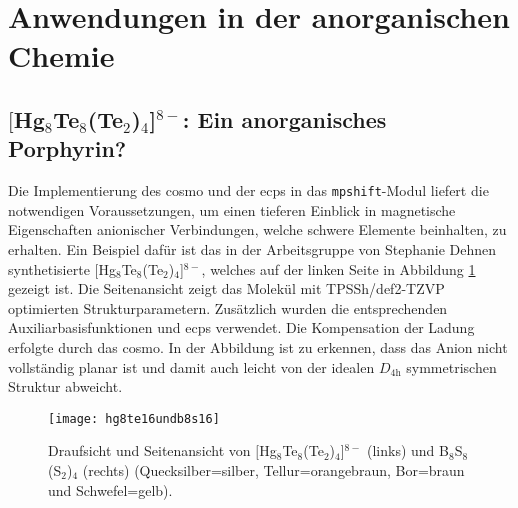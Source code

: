 \section{Anwendungen in der anorganischen Chemie}
\FloatBarrier
\subsection{\texorpdfstring{$[$Hg$_8$Te$_8$(Te$_2$)$_4$]$^{8-}$}{[Hg\_8Te\_8(Te\_2)\_4]8-}: Ein anorganisches Porphyrin?}\label{anorgporh}
Die Implementierung des \ac{cosmo}\supercite{klamt1993cosmo} und der \acp{ecp} in das \texttt{mpshift}-Modul liefert die notwendigen Voraussetzungen, um einen tieferen Einblick in magnetische Eigenschaften anionischer Verbindungen, welche schwere Elemente beinhalten, zu erhalten. Ein Beispiel dafür ist das in der Arbeitsgruppe von Stephanie Dehnen synthetisierte $[$Hg$_8$Te$_8$(Te$_2$)$_4$]$^{8-}$\supercite{dehnenhg4te8}, welches auf der linken Seite in Abbildung \ref{abb:hg8te16undb8s16} gezeigt ist. Die Seitenansicht zeigt das Molekül mit TPSSh\supercite{tao2003climbing}/def2-TZVP\supercite{weigend2005balanced} optimierten Strukturparametern. Zusätzlich wurden die entsprechenden Auxiliarbasisfunktionen\supercite{weigend2006accurate} und \acp{ecp}\supercite{peterson2003systematically} verwendet. Die Kompensation der Ladung erfolgte durch das \ac{cosmo}. In der Abbildung ist zu erkennen, dass das Anion nicht vollständig planar ist und damit auch leicht von der idealen $D_{4\textrm{h}}$ symmetrischen Struktur abweicht. 
\begin{figure}[ht!]
	\centering
	\texttt{[image: hg8te16undb8s16]}
	\captionsetup{figurewithin = chapter}
	\captionsetup{font=small, labelfont=bf}\caption[{Abbildung von $[$Hg$_8$Te$_8$(Te$_2$)$_4$]$^{8-}$ und B$_8$S$_8$(S$_2$)$_4$}]{Draufsicht und Seitenansicht von $[$Hg$_8$Te$_8$(Te$_2$)$_4$]$^{8-}$ (links) und B$_8$S$_8$(S$_2$)$_4$ (rechts) (Quecksilber=silber, Tellur=orangebraun, Bor=braun und Schwefel=gelb).}
\label{abb:hg8te16undb8s16}
\end{figure}

